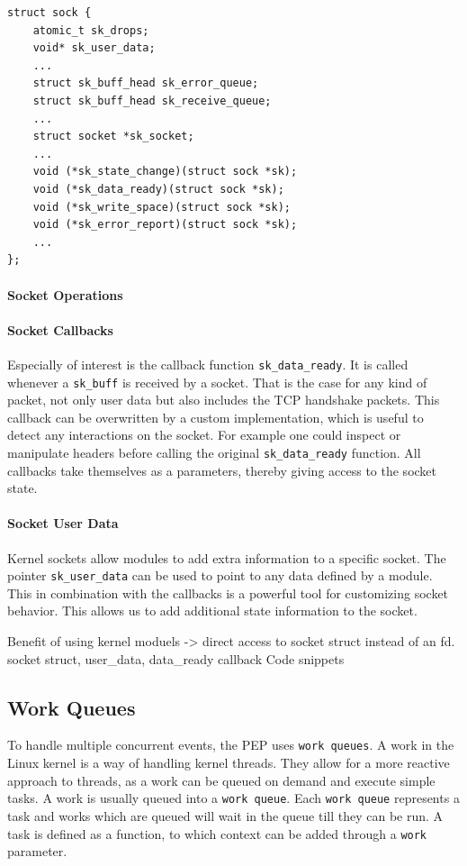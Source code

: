 \documentclass[a4paper,english, 11pt]{report}
\begin{document}
\noindent\begin{minipage}{\linewidth}
\begin{verbatim}
struct sock {
    atomic_t sk_drops;
    void* sk_user_data;
    ...
    struct sk_buff_head	sk_error_queue;
    struct sk_buff_head	sk_receive_queue;
    ...
    struct socket *sk_socket;
    ...
    void (*sk_state_change)(struct sock *sk);
    void (*sk_data_ready)(struct sock *sk);
    void (*sk_write_space)(struct sock *sk);
    void (*sk_error_report)(struct sock *sk);
    ...
};
\end{verbatim}
\label{fig:kern_sock}
\end{minipage}

\paragraph{Socket Operations}

\paragraph{Socket Callbacks}
Especially of interest is the callback function \verb|sk_data_ready|. It is called whenever a \verb|sk_buff| is received by a socket. That is the case for any kind of packet, not only user data but also includes the TCP handshake packets. This callback can be overwritten by a custom implementation, which is useful to detect any interactions on the socket. For example one could inspect or manipulate headers before calling the original \verb|sk_data_ready| function. All callbacks take themselves as a parameters, thereby giving access to the socket state. \\

\paragraph{Socket User Data}
Kernel sockets allow modules to add extra information to a specific socket. The pointer \verb|sk_user_data| can be used to point to any data defined by a module. This in combination with the callbacks is a powerful tool for customizing socket behavior. This allows us to add additional state information to the socket.

Benefit of using kernel moduels -> direct access to socket struct instead of an fd.
socket struct, user\_data, data\_ready callback
Code snippets

\subsection{Work Queues}
To handle multiple concurrent events, the PEP uses \verb|work queues|. A work in the Linux kernel is a way of handling kernel threads. They allow for a more reactive approach to threads, as a work can be queued on demand and execute simple tasks. A work is usually queued into a \verb|work queue|. Each \verb|work queue| represents a task and works which are queued will wait in the queue till they can be run. A task is defined as a function, to which context can be added through a \verb|work| parameter.\\
\end{document}
